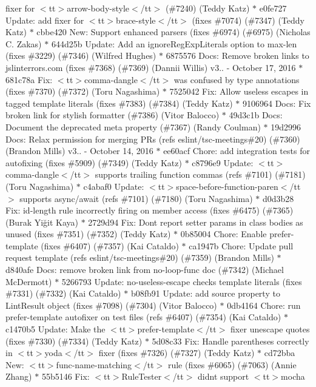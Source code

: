 \begin{DoxyItemize}
fixer for $<$tt$>$arrow-\/body-\/style$<$/tt$>$ (\#7240) (\+Teddy Katz) \texorpdfstring{$\ast$}{*} e0fe727 Update\+: add fixer for $<$tt$>$brace-\/style$<$/tt$>$ (fixes \#7074) (\#7347) (\+Teddy Katz) \texorpdfstring{$\ast$}{*} cbbe420 New\+: Support enhanced parsers (fixes \#6974) (\#6975) (\+Nicholas C. Zakas) \texorpdfstring{$\ast$}{*} 644d25b Update\+: Add an ignore\+Reg\+Exp\+Literals option to max-\/len (fixes \#3229) (\#7346) (\+Wilfred Hughes) \texorpdfstring{$\ast$}{*} 6875576 Docs\+: Remove broken links to jslinterrors.\+com (fixes \#7368) (\#7369) (\+Dannii Willis)  v3.. -\/ October 17, 2016  \texorpdfstring{$\ast$}{*} 681c78a Fix\+: $<$tt$>$comma-\/dangle$<$/tt$>$ was confused by type annotations (fixes \#7370) (\#7372) (\+Toru Nagashima) \texorpdfstring{$\ast$}{*} 7525042 Fix\+: Allow useless escapes in tagged template literals (fixes \#7383) (\#7384) (\+Teddy Katz) \texorpdfstring{$\ast$}{*} 9106964 Docs\+: Fix broken link for stylish formatter (\#7386) (\+Vitor Balocco) \texorpdfstring{$\ast$}{*} 49d3c1b Docs\+: Document the deprecated meta property (\#7367) (\+Randy Coulman) \texorpdfstring{$\ast$}{*} 19d2996 Docs\+: Relax permission for merging PRs (refs eslint/tsc-\/meetings\#20) (\#7360) (\+Brandon Mills)  v3.. -\/ October 14, 2016  \texorpdfstring{$\ast$}{*} ee60acf Chore\+: add integration tests for autofixing (fixes \#5909) (\#7349) (\+Teddy Katz) \texorpdfstring{$\ast$}{*} c8796e9 Update\+: $<$tt$>$comma-\/dangle$<$/tt$>$ supports trailing function commas (refs \#7101) (\#7181) (\+Toru Nagashima) \texorpdfstring{$\ast$}{*} c4abaf0 Update\+: $<$tt$>$space-\/before-\/function-\/paren$<$/tt$>$ supports async/await (refs \#7101) (\#7180) (\+Toru Nagashima) \texorpdfstring{$\ast$}{*} d0d3b28 Fix\+: id-\/length rule incorrectly firing on member access (fixes \#6475) (\#7365) (\+Burak Yiğit Kaya) \texorpdfstring{$\ast$}{*} 2729d94 Fix\+: Don\textquotesingle{}t report setter params in class bodies as unused (fixes \#7351) (\#7352) (\+Teddy Katz) \texorpdfstring{$\ast$}{*} 0b85004 Chore\+: Enable prefer-\/template (fixes \#6407) (\#7357) (\+Kai Cataldo) \texorpdfstring{$\ast$}{*} ca1947b Chore\+: Update pull request template (refs eslint/tsc-\/meetings\#20) (\#7359) (\+Brandon Mills) \texorpdfstring{$\ast$}{*} d840afe Docs\+: remove broken link from no-\/loop-\/func doc (\#7342) (\+Michael Mc\+Dermott) \texorpdfstring{$\ast$}{*} 5266793 Update\+: no-\/useless-\/escape checks template literals (fixes \#7331) (\#7332) (\+Kai Cataldo) \texorpdfstring{$\ast$}{*} b08fb91 Update\+: add source property to Lint\+Result object (fixes \#7098) (\#7304) (\+Vitor Balocco) \texorpdfstring{$\ast$}{*} 0db4164 Chore\+: run prefer-\/template autofixer on test files (refs \#6407) (\#7354) (\+Kai Cataldo) \texorpdfstring{$\ast$}{*} c1470b5 Update\+: Make the $<$tt$>$prefer-\/template$<$/tt$>$ fixer unescape quotes (fixes \#7330) (\#7334) (\+Teddy Katz) \texorpdfstring{$\ast$}{*} 5d08c33 Fix\+: Handle parentheses correctly in $<$tt$>$yoda$<$/tt$>$ fixer (fixes \#7326) (\#7327) (\+Teddy Katz) \texorpdfstring{$\ast$}{*} cd72bba New\+: $<$tt$>$func-\/name-\/matching$<$/tt$>$ rule (fixes \#6065) (\#7063) (\+Annie Zhang) \texorpdfstring{$\ast$}{*} 55b5146 Fix\+: $<$tt$>$\+Rule\+Tester$<$/tt$>$ didn\textquotesingle{}t support $<$tt$>$mocha 
\end{DoxyItemize}
